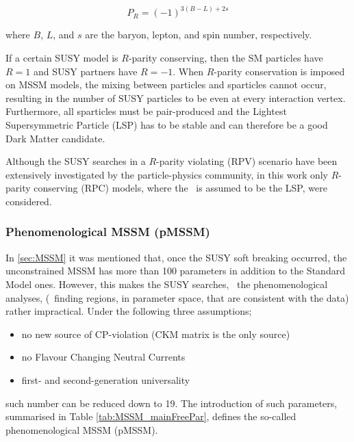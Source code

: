 				\begin{equation}
					P_R = \left ( -1 \right )^{3 \left (B - L \right )+ 2s}
				\end{equation}

				\noindent where $B$, $L$, and $s$ are the baryon, lepton, and spin number, respectively.	

				If a certain SUSY model is $R$-parity conserving, then the SM particles have $R = 1$ and SUSY partners have $R=-1$. When $R$-parity conservation is imposed on MSSM models, the mixing between particles and sparticles cannot occur, resulting in the number of SUSY particles to be even at every interaction vertex. Furthermore, all sparticles must be pair-produced and the Lightest Supersymmetric Particle (LSP) has to be stable and can therefore be a good Dark Matter candidate. %

				Although the SUSY searches in a $R$-parity violating (RPV) scenario have been extensively investigated by the particle-physics community, in this work only $R$-parity conserving (RPC) models, where the \ninoone\ is assumed to be the LSP, were considered.

			\subsubsection*{Phenomenological MSSM (pMSSM)}

				In \ref{sec:MSSM} it was mentioned that, once the SUSY soft breaking occurred, the unconstrained MSSM has more than 100 parameters in addition to the Standard Model ones. However, this makes the SUSY searches, \ie\ the phenomenological analyses, (\eg\ finding regions, in parameter space, that are consistent with the data) rather impractical.	Under the following three assumptions; 

				\begin{itemize}
					\item no new source of CP-violation (CKM matrix is the only source)
					\item no Flavour Changing Neutral Currents
					\item first- and second-generation universality
				\end{itemize}
				
				such number can be reduced down to 19. The introduction of such parameters, summarised in Table \ref{tab:MSSM_mainFreePar}, defines the so-called phenomenological MSSM (pMSSM).
				
